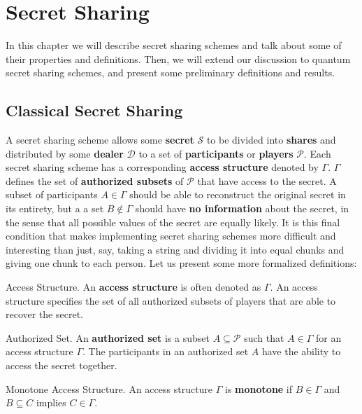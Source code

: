 \chapter{Secret Sharing}
\label{ch:ss}

In this chapter we will describe secret sharing schemes and talk about some of their properties and definitions. Then, we will extend our discussion to quantum secret sharing schemes, and present some preliminary definitions and results.

\section{Classical Secret Sharing}
\label{sec:css}

 A secret sharing scheme allows some \textbf{secret} $\mathcal{S}$ to be divided into \textbf{shares} and distributed by some \textbf{dealer} $\mathcal{D}$ to a set of \textbf{participants} or \textbf{players} $\mathcal{P}$. Each secret sharing scheme has a corresponding \textbf{access structure} denoted by $\Gamma$. $\Gamma$ defines the set of \textbf{authorized subsets} of $\mathcal{P}$ that have access to the secret. A subset of participants $A \in \Gamma$ should be able to reconstruct the original secret in its entirety, but a a set $B \notin \Gamma$ should have \textbf{no information} about the secret, in the sense that all possible values of the secret are equally likely. It is this final condition that makes implementing secret sharing schemes more difficult and interesting than just, say, taking a string and dividing it into equal chunks and giving one chunk to each person. Let us present some more formalized definitions:

\begin{definition}{Access Structure.}
    \label{defn:access-structure}
    An \textbf{access structure} is often denoted as $\Gamma$. An access structure specifies the set of all authorized subsets of players that are able to recover the secret.
\end{definition}

\begin{definition}{Authorized Set.}
    \label{defn:authorized-set}
    An \textbf{authorized set} is a subset $A \subseteq \mathcal{P}$ such that $A \in \Gamma$ for an access structure $\Gamma$. The participants in an authorized set $A$ have the ability to access the secret together.
\end{definition}

\begin{definition}{Monotone Access Structure.}
    \label{defn:monotone}
    An access structure $\Gamma$ is \textbf{monotone} if $B \in \Gamma$ and $B \subseteq C$ implies $C \in \Gamma$.
\end{definition}

